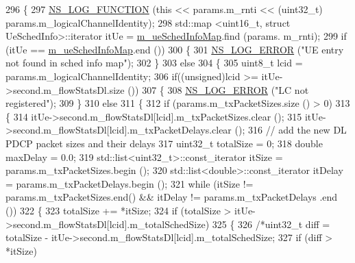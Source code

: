 \begin{DoxyCode}
296 \{
297   \hyperlink{log-macros-disabled_8h_a90b90d5bad1f39cb1b64923ea94c0761}{NS\_LOG\_FUNCTION} (\textcolor{keyword}{this} << params.m\_rnti << (uint32\_t) params.m\_logicalChannelIdentity);
298   std::map <uint16\_t, struct UeSchedInfo>::iterator itUe = \hyperlink{classns3_1_1MmWaveFlexTtiMaxWeightMacScheduler_a6c90cb4d10b9d6347f7447508f5bebfe}{m\_ueSchedInfoMap}.find (params.
      m\_rnti);
299   \textcolor{keywordflow}{if} (itUe == \hyperlink{classns3_1_1MmWaveFlexTtiMaxWeightMacScheduler_a6c90cb4d10b9d6347f7447508f5bebfe}{m\_ueSchedInfoMap}.end ())
300   \{
301         \hyperlink{group__logging_ga0261a8db1d4ac5f79417d117634fd455}{NS\_LOG\_ERROR} (\textcolor{stringliteral}{"UE entry not found in sched info map"});
302   \}
303   \textcolor{keywordflow}{else}
304   \{
305         uint8\_t lcid = params.m\_logicalChannelIdentity;
306         \textcolor{keywordflow}{if}((\textcolor{keywordtype}{unsigned})lcid >= itUe->second.m\_flowStatsDl.size ())
307         \{
308                 \hyperlink{group__logging_ga0261a8db1d4ac5f79417d117634fd455}{NS\_LOG\_ERROR} (\textcolor{stringliteral}{"LC not registered"});
309         \}
310         \textcolor{keywordflow}{else}
311         \{
312                 \textcolor{keywordflow}{if} (params.m\_txPacketSizes.size () > 0)
313                 \{
314                         itUe->second.m\_flowStatsDl[lcid].m\_txPacketSizes.clear ();
315                         itUe->second.m\_flowStatsDl[lcid].m\_txPacketDelays.clear ();
316                         \textcolor{comment}{// add the new DL PDCP packet sizes and their delays}
317                         uint32\_t totalSize = 0;
318                         \textcolor{keywordtype}{double} maxDelay = 0.0;
319                         std::list<uint32\_t>::const\_iterator itSize = params.m\_txPacketSizes.begin ();
320                         std::list<double>::const\_iterator itDelay = params.m\_txPacketDelays.begin ();
321                         \textcolor{keywordflow}{while} (itSize != params.m\_txPacketSizes.end() && itDelay != params.m\_txPacketDelays
      .end ())
322                         \{
323                                 totalSize += *itSize;
324                                 \textcolor{keywordflow}{if} (totalSize > itUe->second.m\_flowStatsDl[lcid].m\_totalSchedSize)
325                                 \{
326                                         \textcolor{comment}{/*uint32\_t diff = totalSize -
       itUe->second.m\_flowStatsDl[lcid].m\_totalSchedSize;}
327 \textcolor{comment}{                                        if (diff > *itSize)}

\end{DoxyCode}
